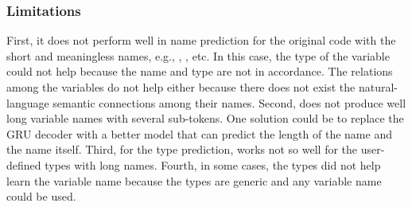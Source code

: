 \subsubsection{Limitations}
\label{sec:limitations}

First, it does not perform well in name prediction for the original
code with the short and meaningless names, e.g., , ,
etc. In this case, the type of the variable could not help because the
name and type are not in accordance. The relations among the variables
do not help either because there does not exist the natural-language
semantic connections among their names. Second, {\tool} does not
produce well long variable names with several sub-tokens. One solution
could be to replace the GRU decoder with a better model that can
predict the length of the name and the name itself. Third, for the
type prediction, {\tool} works not so well for the user-defined types
with long names. Fourth, in some cases, the types did not
help learn the variable name because the types are generic and
any variable name could be used.
